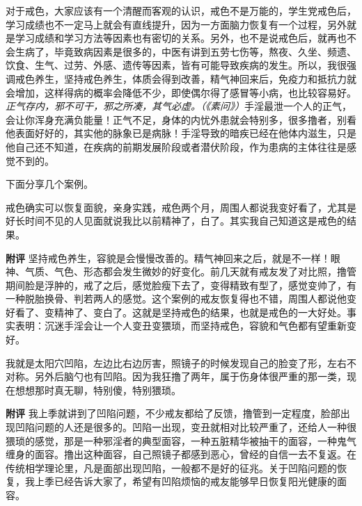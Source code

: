 对于戒色，大家应该有一个清醒而客观的认识，戒色不是万能的，学生党戒色后，学习成绩也不一定马上就会有直线提升，因为一方面脑力恢复有一个过程，另外就是学习成绩和学习方法等因素也有密切的关系。另外，也不是说戒色后，就再也不会生病了，毕竟致病因素是很多的，中医有讲到五劳七伤等，熬夜、久坐、频遗、饮食、生气、过劳、外感、遗传等因素，皆有可能导致疾病的发生。所以，我很强调戒色养生，坚持戒色养生，体质会得到改善，精气神回来后，免疫力和抵抗力就会增加，这样得病的概率会降低不少，即使偶尔得了感冒等小病，也比较容易好。\textit{正气存内，邪不可干，邪之所凑，其气必虚。（《素问》）}手淫最泄一个人的正气，会让你浑身充满负能量！正气不足，身体的内忧外患就会特别多，很多撸者，别看他表面好好的，其实他的脉象已是病脉！手淫导致的暗疾已经在他体内滋生，只是他自己还不知道，在疾病的前期发展阶段或者潜伏阶段，作为患病的主体往往是感觉不到的。

下面分享几个案例。

\begin{case}
    戒色确实可以恢复面貌，亲身实践，戒色两个月，周围人都说我变好看了，尤其是好长时间不见的人见面就说我比以前精神了，白了。其实我自己知道这是戒色的结果。

    \textbf{附评} 坚持戒色养生，容貌是会慢慢改善的。精气神回来之后，就是不一样！眼神、气质、气色、形态都会发生微妙的好变化。前几天就有戒友发了对比照，撸管期间脸是浮肿的，戒了之后，感觉脸瘦下去了，变得精致有型了，感觉变帅了，有一种脱胎换骨、判若两人的感觉。这个案例的戒友恢复得也不错，周围人都说他变好看了、变精神了、变白了。这就是坚持戒色的结果，也就是戒色的一大好处。事实表明：沉迷手淫会让一个人变丑变猥琐，而坚持戒色，容貌和气色都有望重新变好。
\end{case}

\begin{case}
    我就是太阳穴凹陷，左边比右边厉害，照镜子的时候发现自己的脸变了形，左右不对称。另外后脑勺也有凹陷。因为我狂撸了两年，属于伤身体很严重的那一类，现在想想那时真无聊，特别傻，特别猥琐。

    \textbf{附评} 我上季就讲到了凹陷问题，不少戒友都给了反馈，撸管到一定程度，脸部出现凹陷问题的人还是很多的。凹陷一出现，变丑就相对比较严重了，还给人一种很猥琐的感觉，那是一种邪淫者的典型面容，一种五脏精华被抽干的面容，一种鬼气缠身的面容。撸出这种面容，自己照镜子都感到恶心，曾经的自信一去不复返。在传统相学理论里，凡是面部出现凹陷，一般都不是好的征兆。关于凹陷问题的恢复，我上季已经告诉大家了，希望有凹陷烦恼的戒友能够早日恢复阳光健康的面容。
\end{case}

